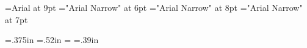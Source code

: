 \let\redpc\pcfee
\let\newgh\pcblu

\font\helv=Arial at 9pt
\font\helvx="Arial Narrow" at 6pt
\font\helvy="Arial Narrow" at 8pt
\font\helvz="Arial Narrow" at 7pt

\let\everymathextra\relax
\let\preamble\relax


\def\appendixstr{Appendix }


\let\seq\relax
\let\lname\relax
\let\sname\relax
\let\uname\relax
\let\chars\relax
\let\names\relax
\let\glyph\relax
\let\rglyf\relax
\let\image\relax
\let\notes\relax
\let\stags\relax

\let\sqdbcun\relax
\let\sqdbpua\relax
\let\sqseq\relax
\let\sqinv\relax
\let\sqchr\relax

\let\imagefloat\relax
\let\imagecaption\relax

\let\remfor\relax
\let\Hhhhh\relax

\def\unames{\eight\rm}

\def\ofs#1#2#3{}
\let\ofspc\pcxxv

\def\ccchr{\pcssxx}
\def\ccuni{\helvx}

\def\beginchartlist{\begin{2column}\offinterlineskip} %
\def\endchartlist{\end{2column}\vfil\supereject}

\def\cclrow#1#2#3{%
        \vbox{\hsize3.2in\parindent0pt
              \hbox to 3.2in{%
              \hbox to .4in{\helvy#1\hfil}%
              \hbox to .4in{\pcssxx#2\hss}%
              \hbox to 2.4in{\hsize2.4in\vtop{\par\helvy\leavevmode\rightskip0pt plus1fil\relax#3\endgraf}}%
                            \hfil}}\vfil}
\def\cclnum#1{{\helv#1}}
\def\cclchr{\redpc}%
\def\ccluni{\Sans\eight\rm}

\let\twocol\relax

\let\glyf\relax
\let\fchr\relax
\let\fhex\relax
\let\dist\relax
\let\rhex\relax

\newdimen\ccwd \ccwd=.375in\relax
\newdimen\ccht \ccht=.52in\relax
\newdimen\cccwd \cccwd=\ccwd\relax
\newdimen\cccht \cccht=.39in\relax

\newdimen\cdliwd \cdliwd=2.75pc
\newdimen\slcwd \slcwd=3.65pc
\def\slcc{\pcssxxx}
\def\slcu{\helvy}

